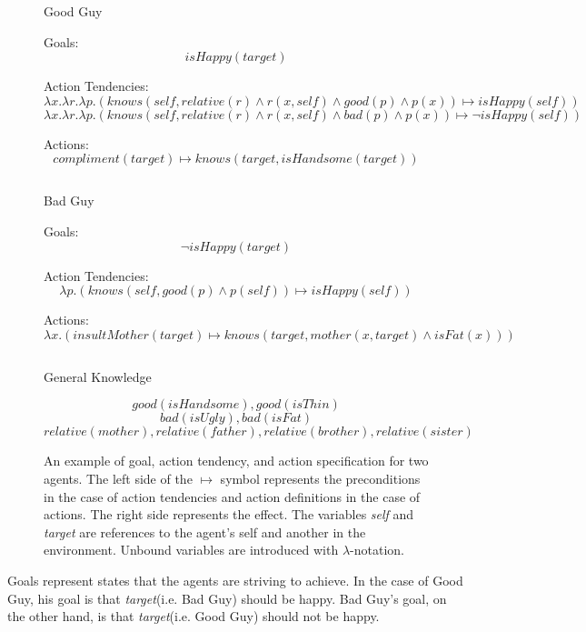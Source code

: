 \documentclass{article}
\begin{document}
\begin{figure}[htbp!]
  
  \begin{center}
    \large{Good Guy}
  \end{center}
  
  Goals:
  \[
  isHappy(target)
  \]

  Action Tendencies:
  \[
  \lambda x.\lambda r.\lambda p.(knows(self, relative(r) \wedge r(x,self) \wedge good(p) \wedge p(x)) \mapsto isHappy(self))
  \]
  \[
  \lambda x.\lambda r.\lambda p.(knows(self, relative(r) \wedge r(x,self) \wedge bad(p) \wedge p(x)) \mapsto \neg isHappy(self))
  \]

  Actions:
  \[
  compliment(target) \mapsto knows(target, isHandsome(target))
  \]

  \[\]

  \begin{center}
    \large{Bad Guy}
  \end{center}
  
  Goals:
  \[
  \neg isHappy(target)
  \]

  Action Tendencies:
  \[
  \lambda p.(knows(self, good(p) \wedge p(self)) \mapsto isHappy(self))
  \]

  Actions:
  \[
  \lambda x.(insultMother(target) \mapsto knows(target, mother(x, target) \wedge
  isFat(x))) 
  \]
  
  \[\]

  \begin{center} \large{General Knowledge} \end{center}

  \[
  good(isHandsome),
  good(isThin)
  \]
  \[
  bad(isUgly),
  bad(isFat)
  \]
  \[
  relative(mother), relative(father), relative(brother), relative(sister)
  \]

  \caption{An example of goal, action tendency, and action
    specification for two agents.  The left side of the $\mapsto$ symbol
    represents the preconditions in the case of action tendencies and
    action definitions in the case of actions.  The right side
    represents the effect.  The variables \emph{self} and
    \emph{target} are references to the agent's self and another in
    the environment.  Unbound variables are introduced with $\lambda$-notation.}
  \label{example_goals}

\end{figure}

Goals represent states that the agents are striving to achieve.  In
the case of Good Guy, his goal is that \emph{target}(i.e. Bad Guy)
should be happy.  Bad Guy's goal, on the other hand, is that
\emph{target}(i.e. Good Guy) should not be happy.
\end{document}
